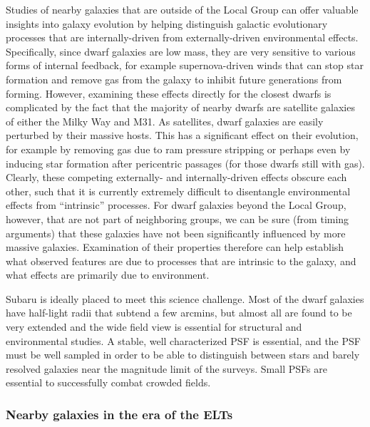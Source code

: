 Studies of nearby galaxies that are outside of the Local Group can offer
valuable insights into galaxy evolution by helping distinguish galactic
evolutionary processes that are internally-driven from externally-driven
environmental effects. Specifically, since dwarf galaxies are low mass,
they are very sensitive to various forms of internal feedback, for
example supernova-driven winds that can stop star formation and  
remove gas from the galaxy to inhibit future generations from
forming. However, examining these effects directly for the closest
dwarfs is complicated by the fact that the majority of nearby dwarfs are
satellite galaxies of either the Milky Way and M31. As satellites, dwarf
galaxies are easily perturbed by their massive hosts. This has a
significant effect on their evolution, for example by removing gas due
to ram pressure stripping or perhaps even by inducing star formation
after pericentric passages (for those dwarfs still with gas). Clearly,
these competing externally- and internally-driven effects obscure each
other, such that it is currently extremely difficult to disentangle
environmental effects from ``intrinsic'' processes. For dwarf galaxies
beyond the Local Group, however, that are not part of neighboring
groups, we can be sure (from timing arguments) that these galaxies have
not been significantly influenced by more massive galaxies. Examination
of their properties therefore can help establish what observed features
are due to processes that are intrinsic to the galaxy, and what effects
are primarily due to environment. 

Subaru is ideally placed to meet this science challenge. Most of the
dwarf galaxies have half-light radii that subtend a few arcmins, but
almost all are found to be very extended and the wide field view is
essential for structural and environmental studies. A stable, well
characterized PSF is essential, and the PSF must be well sampled in
order to be able to distinguish between stars and barely resolved
galaxies near the magnitude limit of the surveys. Small PSFs are
essential to successfully combat crowded fields. 

\subsubsection{Nearby galaxies in the era of the ELTs}


